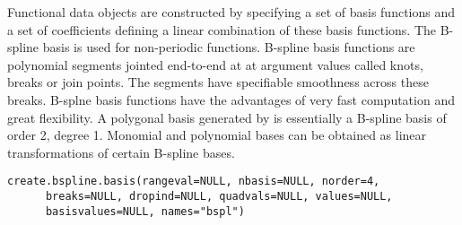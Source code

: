 \begin{Description}\relax
Functional data objects are constructed by specifying a set of basis
functions and a set of coefficients defining a linear combination of
these basis functions.  The B-spline basis is used for non-periodic
functions.  B-spline basis functions are polynomial segments jointed
end-to-end at at argument values called knots, breaks or join points.
The segments have specifiable smoothness across these breaks.  B-splne
basis functions have the advantages of very fast computation and great
flexibility.  A polygonal basis generated by
 is essentially a B-spline basis of order
2, degree 1.  Monomial and polynomial bases can be obtained as linear
transformations of certain B-spline bases.
\end{Description}
\begin{Usage}
\begin{verbatim}
create.bspline.basis(rangeval=NULL, nbasis=NULL, norder=4,
      breaks=NULL, dropind=NULL, quadvals=NULL, values=NULL,
      basisvalues=NULL, names="bspl")
\end{verbatim}
\end{Usage}
